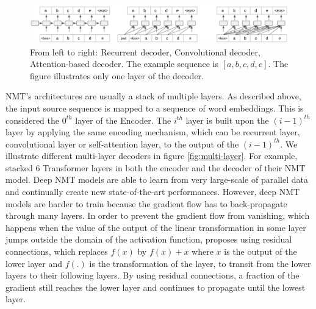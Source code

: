 \begin{figure}[htbp]
\includegraphics[width=\textwidth]{graphics/decoding.png}
\caption[Illustration of 3 most popular auto-regressive decoding paradigms]{From left to right: Recurrent decoder, Convolutional decoder, Attention-based decoder. The example sequence is $[a,b,c,d,e]$. The figure illustrates only one layer of the decoder.}
\label{fig:decoding}
\end{figure}

NMT's architectures are usually a stack of multiple layers. As described above, the input source sequence is mapped to a sequence of word embeddings. This is considered the $0^{th}$ layer of the Encoder. The $i^{th}$ layer is built upon the $(i-1)^{th}$ layer by applying the same encoding mechanism, which can be recurrent layer, convolutional layer or self-attention layer, to the output of the $(i-1)^{th}$. We illustrate different multi-layer decoders in figure \ref{fig:multi-layer}. For example, \citet{Vaswani17attention} stacked 6 Transformer layers in both the encoder and the decoder of their NMT model. Deep NMT models are able to learn from very large-scale of parallel data \citep{Ott18scaling} and continually create new state-of-the-art performances. However, deep NMT models are harder to train because the gradient flow has to back-propagate through many layers. In order to prevent the gradient flow from vanishing, which happens when the value of the output of the linear transformation in some layer jumps outside the domain of the activation function, \citep{He16deep} proposes using residual connections, which replaces $f(x)$ by $f(x)+x$ where $x$ is the output of the lower layer and $f(.)$ is the transformation of the layer, to transit from the lower layers to their following layers. By using residual connections, a fraction of the gradient still reaches the lower layer and continues to propagate until the lowest layer.

